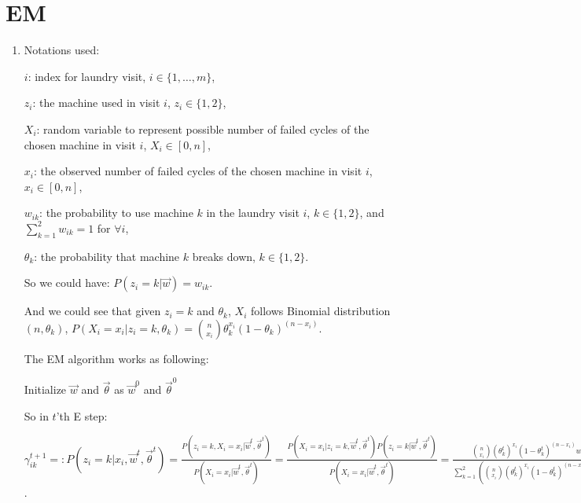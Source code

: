 \documentclass[paper=letter, fontsize=12pt]{article}
\begin{document}
\section{EM}
\begin{enumerate}[label=(\alph*)]
	\item Notations used:
	
	$i$: index for laundry visit, $i \in \{1, \dots, m\}$,
	
	$z_i$: the machine used in visit $i$, $z_i \in \{1, 2\}$,
	
	$X_i$: random variable to represent possible number of failed cycles of the chosen machine in visit $i$, $X_i \in [0, n]$,
	
	$x_i$: the observed number of failed cycles of the chosen machine in visit $i$, $x_i \in [0, n]$,
	
	$w_{ik}$: the probability to use machine $k$ in the laundry visit $i$, $k \in \{1, 2\}$, and $\sum_{k = 1}^{2} w_{ik} = 1$ for $\forall i$,
	
	$\theta_k$: the probability that machine $k$ breaks down, $k \in \{1, 2\}$.
	
	So we could have: $P(z_i = k | \vec{w}) = w_{ik}$.
	
	And we could see that given $z_i = k$ and $\theta_{k}$, $X_i$ follows Binomial distribution $(n, \theta_{k})$, $P(X_i = x_i | z_i = k, \theta_k) = \binom{n}{x_i} \theta_k^{x_{i}} (1-\theta_k)^{(n-x_{i})}$.
	
	The EM algorithm works as following:
	
	\begin{algorithm}[H]
		Initialize $\vec{w}$ and $\vec{\theta}$ as $\vec{w}^0$ and $\vec{\theta}^0$\;
	\end{algorithm}
	
	So in $t$'th E step:
	
	$\gamma_{ik}^{t+1} =: P(z_i = k | x_i, \vec{w}^t, \vec{\theta}^t) = \frac{P(z_i = k, X_i = x_i | \vec{w}^t, \vec{\theta}^t)}{P(X_i = x_i | \vec{w}^t, \vec{\theta}^t)} = \frac{P(X_i = x_i | z_i = k, \vec{w}^t, \vec{\theta}^t) P(z_i = k | \vec{w}^t, \vec{\theta}^t)}{P(X_i = x_i | \vec{w}^t, \vec{\theta}^t)} = \frac{\binom{n}{x_i} {(\theta_k^t)}^{x_{i}} {(1-\theta_k^t)}^{(n-x_{i})} w_{ik}^t}{\sum_{k = 1}^{2}(\binom{n}{x_i} {(\theta_k^t)}^{x_{i}} {(1-\theta_k^t)}^{(n-x_{i})} w_{ik}^t) } = \frac{ {(\theta_k^t)}^{x_{i}} {(1-\theta_k^t)}^{(n-x_{i})} w_{ik}^t}{\sum_{k = 1}^{2}( {(\theta_k^t)}^{x_{i}} {(1-\theta_k^t)}^{(n-x_{i})} w_{ik}^t) }$.
	

\end{enumerate}
\end{document}
